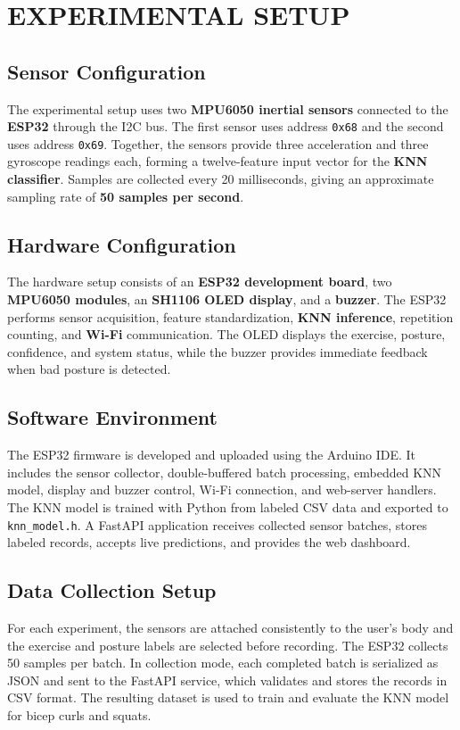 \chapter{EXPERIMENTAL SETUP}

\section{Sensor Configuration}
The experimental setup uses two \textbf{MPU6050 inertial sensors} connected to the \textbf{ESP32}
through the I2C bus. The first sensor uses address \texttt{0x68} and the second
uses address \texttt{0x69}. Together, the sensors provide three acceleration and
three gyroscope readings each, forming a twelve-feature input vector for the \textbf{KNN
classifier}. Samples are collected every 20 milliseconds, giving an approximate
sampling rate of \textbf{50 samples per second}.

\section{Hardware Configuration}
The hardware setup consists of an \textbf{ESP32 development board}, two \textbf{MPU6050 modules},
an \textbf{SH1106 OLED display}, and a \textbf{buzzer}. The ESP32 performs sensor acquisition,
feature standardization, \textbf{KNN inference}, repetition counting, and \textbf{Wi-Fi}
communication. The OLED displays the exercise, posture, confidence, and system
status, while the buzzer provides immediate feedback when bad posture is detected.

\section{Software Environment}
The ESP32 firmware is developed and uploaded using the Arduino IDE. It includes
the sensor collector, double-buffered batch processing, embedded KNN model,
display and buzzer control, Wi-Fi connection, and web-server handlers. The KNN
model is trained with Python from labeled CSV data and exported to
\texttt{knn\_model.h}. A FastAPI application receives collected sensor batches,
stores labeled records, accepts live predictions, and provides the web dashboard.

\section{Data Collection Setup}
For each experiment, the sensors are attached consistently to the user's body and
the exercise and posture labels are selected before recording. The ESP32 collects
50 samples per batch. In collection mode, each completed batch is serialized as
JSON and sent to the FastAPI service, which validates and stores the records in
CSV format. The resulting dataset is used to train and evaluate the KNN model for
bicep curls and squats.

